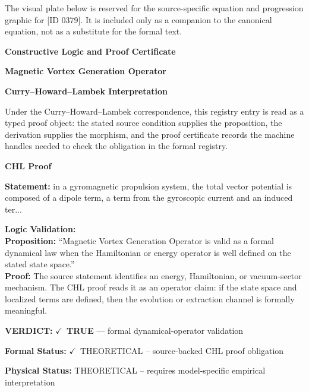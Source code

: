 \begingroup\footnotesize\sloppy
The visual plate below is reserved for the source-specific equation and progression graphic for [ID 0379]. It is included only as a companion to the canonical equation, not as a substitute for the formal text.
\par\endgroup
\ifTZPDarkEdition
{}
\fi

\clearpage
\begingroup\tzpsupportsetup
\noindent\textbf{\fontsize{10.8pt}{12.8pt}\selectfont [ID 0379] Constructive Logic and Proof Certificate}\par
\noindent\textbf{\fontsize{10pt}{12pt}\selectfont Magnetic Vortex Generation Operator}\par
\vspace{0.45em}
\begingroup
\footnotesize
\setlength{\parskip}{0.22em}
\setlength{\parindent}{0pt}
\noindent\textbf{Curry--Howard--Lambek Interpretation}\par
Under the Curry--Howard--Lambek correspondence, this registry entry is read as a typed proof
object: the stated source condition supplies the proposition, the derivation supplies the
morphism, and the proof certificate records the machine handles needed to check the obligation
in the formal registry.

\vspace{0.45em}
\noindent\textbf{CHL Proof}\par
\textbf{Statement:} in a gyromagnetic propulsion system, the total vector potential is composed of a dipole
term, a term from the gyroscopic current and an induced ter...

\textbf{Logic Validation:}\\
\textbf{Proposition:} ``Magnetic Vortex Generation Operator is valid as a formal dynamical law when the
Hamiltonian or energy operator is well defined on the stated state space.''\\
\textbf{Proof:} The source statement identifies an energy, Hamiltonian, or vacuum-sector mechanism. The
CHL proof reads it as an operator claim: if the state space and localized terms are
defined, then the evolution or extraction channel is formally meaningful.

\textbf{VERDICT:} \ensuremath{\checkmark}\ \textbf{TRUE} --- formal dynamical-operator validation

\textbf{Formal Status:} \ensuremath{\checkmark}\ THEORETICAL -- source-backed CHL proof obligation

\textbf{Physical Status:} THEORETICAL -- requires model-specific empirical interpretation
\par\vspace{0.45em}
\par
\ifTZPDarkEdition
{}
\fi
\endgroup
\endgroup

